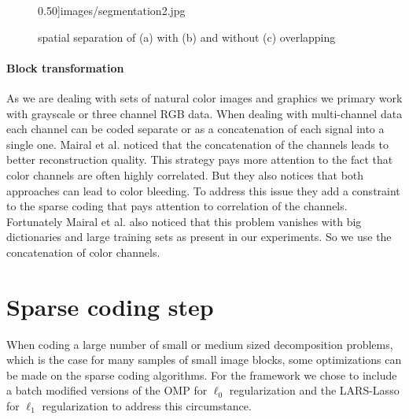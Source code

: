 \begin{figure}[h]
{0.50]{images/segmentation2.jpg}}
\hspace{5mm}
\caption[spatial separation]{spatial separation of (a) with (b) and without (c)
overlapping}
\label{fig:separation}
\end{figure}

\paragraph{Block transformation} As we are dealing with sets of natural
color images and graphics we primary work with grayscale or three
channel RGB data. 
When dealing with multi-channel data each channel can be coded
separate or as a concatenation of each signal into a single one. Mairal et
al.\cite{mairal08sparse} noticed that the concatenation of the channels leads
to better reconstruction quality. This strategy pays more attention to the fact
that color channels are often highly correlated. But they also notices that both
approaches can lead to color bleeding.  
To address this issue they add a constraint to the sparse coding that pays
attention to correlation of the channels. 
Fortunately Mairal et al. also noticed that this problem vanishes with big
dictionaries and large training sets as present in our experiments. So we use
the concatenation of color channels. 


\section{Sparse coding step}
When coding a large number of small or medium sized decomposition problems,
which is the case for many samples of small image blocks, some optimizations can
be made on the sparse coding algorithms. 
For the framework we chose to include a batch modified versions of the OMP for
$\ell_0$ regularization and the LARS-Lasso for $\ell_1$ regularization to
address this circumstance. 

